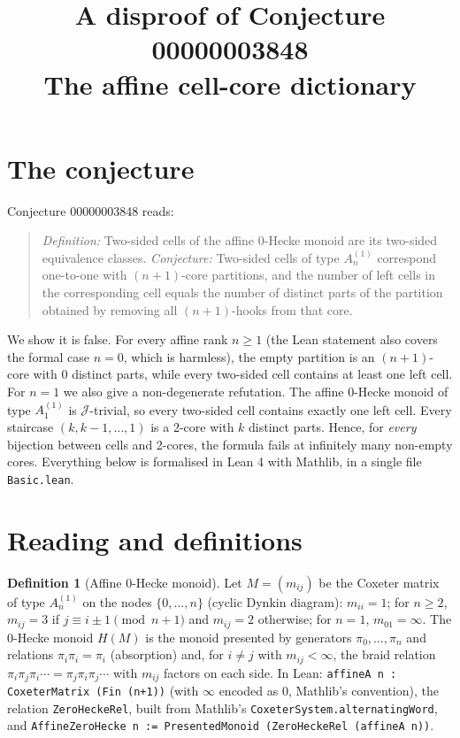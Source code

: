 \documentclass[11pt]{article}
\title{A disproof of Conjecture 00000003848\\[2pt]
\large The affine cell-core dictionary}
\date{}
\theoremstyle{definition}
\newtheorem{definition}[theorem]{Definition}
\theoremstyle{remark}
\renewcommand{\_}{\oldus\allowbreak}
\begin{document}
\sloppy
\maketitle

\section{The conjecture}

Conjecture 00000003848 reads:

\begin{quote}
\emph{Definition:} Two-sided cells of the affine 0-Hecke monoid are its two-sided equivalence classes.
\emph{Conjecture:} Two-sided cells of type $A_n^{(1)}$ correspond one-to-one with $(n+1)$-core partitions, and
the number of left cells in the corresponding cell equals the number of distinct parts of the partition
obtained by removing all $(n+1)$-hooks from that core.
\end{quote}

We show it is false. For every affine rank $n\ge 1$ (the Lean statement also covers the formal case $n=0$,
which is harmless), the empty partition is an $(n+1)$-core with $0$ distinct parts,
while every two-sided cell contains at least one left cell. For $n=1$ we also give a non-degenerate
refutation. The affine 0-Hecke monoid of type $A_1^{(1)}$ is $\mathcal J$-trivial, so every two-sided
cell contains exactly one left cell. Every staircase $(k,k-1,\dots,1)$ is a 2-core with $k$ distinct parts.
Hence, for \emph{every} bijection between cells and 2-cores, the formula fails at infinitely many non-empty
cores. Everything below is formalised in Lean 4 with Mathlib, in a single file \texttt{Basic.lean}.

\section{Reading and definitions}

\begin{definition}[Affine 0-Hecke monoid]
Let $M=(m_{ij})$ be the Coxeter matrix of type $A_n^{(1)}$ on the nodes $\{0,\dots,n\}$ (cyclic Dynkin diagram):
$m_{ii}=1$; for $n\ge 2$, $m_{ij}=3$ if $j\equiv i\pm1 \pmod{n+1}$ and $m_{ij}=2$ otherwise; for $n=1$,
$m_{01}=\infty$. The 0-Hecke monoid $H(M)$ is the monoid presented by generators $\pi_0,\dots,\pi_n$ and
relations $\pi_i\pi_i=\pi_i$ (absorption) and, for $i\ne j$ with $m_{ij}<\infty$, the braid relation
$\pi_i\pi_j\pi_i\cdots=\pi_j\pi_i\pi_j\cdots$ with $m_{ij}$ factors on each side.
In Lean: \texttt{affineA n : CoxeterMatrix (Fin (n+1))} (with $\infty$ encoded as $0$, Mathlib's convention),
the relation \texttt{ZeroHeckeRel}, built from Mathlib's \texttt{CoxeterSystem.alternatingWord}, and
\texttt{AffineZeroHecke n := PresentedMonoid (ZeroHeckeRel (affineA n))}.
\end{definition}
\end{document}

